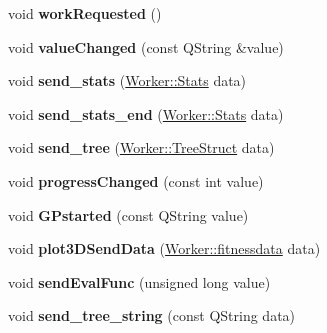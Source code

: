 \begin{DoxyCompactItemize}
\item 
\hypertarget{classWorker_ae4a138e6c8de2af5733d01024cd50ec6}{}void {\bfseries work\+Requested} ()\label{classWorker_ae4a138e6c8de2af5733d01024cd50ec6}

\item 
\hypertarget{classWorker_a30fe947e3103e2634af146469bd77db5}{}void {\bfseries value\+Changed} (const Q\+String \&value)\label{classWorker_a30fe947e3103e2634af146469bd77db5}

\item 
\hypertarget{classWorker_a91359586c82456b3c9d80d574137d7c4}{}void {\bfseries send\+\_\+stats} (\hyperlink{structWorker_1_1Stats}{Worker\+::\+Stats} data)\label{classWorker_a91359586c82456b3c9d80d574137d7c4}

\item 
\hypertarget{classWorker_a3732ec2fcbfcf0a51d455c7535d64bd1}{}void {\bfseries send\+\_\+stats\+\_\+end} (\hyperlink{structWorker_1_1Stats}{Worker\+::\+Stats} data)\label{classWorker_a3732ec2fcbfcf0a51d455c7535d64bd1}

\item 
\hypertarget{classWorker_a10bc16920395564f7051fa11993b9b32}{}void {\bfseries send\+\_\+tree} (\hyperlink{structWorker_1_1TreeStruct}{Worker\+::\+Tree\+Struct} data)\label{classWorker_a10bc16920395564f7051fa11993b9b32}

\item 
\hypertarget{classWorker_a55f2d2f20e208e3f7afd7ce74e241002}{}void {\bfseries progress\+Changed} (const int value)\label{classWorker_a55f2d2f20e208e3f7afd7ce74e241002}

\item 
\hypertarget{classWorker_af5db6a64c346ffc536852bdd4b907579}{}void {\bfseries G\+Pstarted} (const Q\+String value)\label{classWorker_af5db6a64c346ffc536852bdd4b907579}

\item 
\hypertarget{classWorker_a6f488c06d62e3ae49bd5af55fc0f7f90}{}void {\bfseries plot3\+D\+Send\+Data} (\hyperlink{structWorker_1_1fitnessdata}{Worker\+::fitnessdata} data)\label{classWorker_a6f488c06d62e3ae49bd5af55fc0f7f90}

\item 
\hypertarget{classWorker_ae713b051a9447d01ecdd4d6aef0eef9e}{}void {\bfseries send\+Eval\+Func} (unsigned long value)\label{classWorker_ae713b051a9447d01ecdd4d6aef0eef9e}

\item 
\hypertarget{classWorker_a8b434c0f74618a287aac3dd3de204618}{}void {\bfseries send\+\_\+tree\+\_\+string} (const Q\+String data)\label{classWorker_a8b434c0f74618a287aac3dd3de204618}


\end{DoxyCompactItemize}
